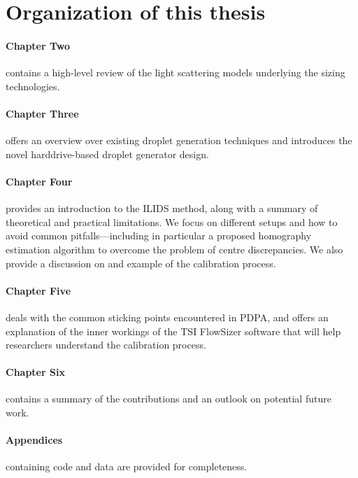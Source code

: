 \documentclass[11.5pt,oneside]{book}
\begin{document}
\section{Organization of this thesis}
\paragraph{Chapter Two} contains a high-level review of the light scattering models
underlying the sizing technologies.

\paragraph{Chapter Three} offers an overview over
existing droplet generation techniques and introduces the novel harddrive-based
droplet generator design.

\paragraph{Chapter Four} provides an introduction to the ILIDS
method, along with a summary of theoretical and practical limitations. We focus
on different setups and how to avoid common pitfalls—including in
particular a proposed homography estimation algorithm to overcome the problem of
centre discrepancies. We also provide a discussion on and example of the
calibration process.

\paragraph{Chapter Five} deals with the common sticking points
encountered in PDPA, and offers an explanation of the inner workings of the TSI
FlowSizer software that will help researchers understand the calibration
process.

\paragraph{Chapter Six} contains a summary of the contributions and an outlook
on potential future work.

\paragraph{Appendices} containing code and data are provided for completeness.
\end{document}
